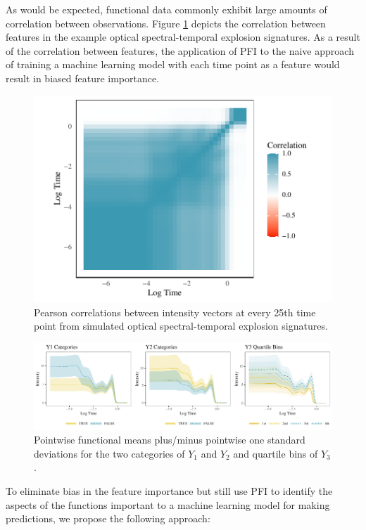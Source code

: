 \documentclass[letterpaper]{article}
\begin{document}
As would be expected, functional data commonly exhibit large amounts of correlation between observations. Figure \ref{fig2} depicts the correlation between features in the example optical spectral-temporal explosion signatures. As a result of the correlation between features, the application of PFI to the naive approach of training a machine learning model with each time point as a feature would result in biased feature importance.

\begin{figure}[t]
\centering
\includegraphics[width=.95\columnwidth]{fig2}
\caption{Pearson correlations between intensity vectors at every 25th time point from simulated optical spectral-temporal explosion signatures.}
\label{fig2}
\end{figure}

\begin{figure}[!ht]
\centering
\includegraphics[width=1.95\columnwidth]{fig3}
\caption{Pointwise functional means plus/minus pointwise one standard deviations for the two categories of $Y_1$ and $Y_2$ and quartile bins of $Y_3$.}
\label{fig3}
\end{figure}

To eliminate bias in the feature importance but still use PFI to identify the aspects of the functions important to a machine learning model for making predictions, we propose the following approach:
\end{document}

